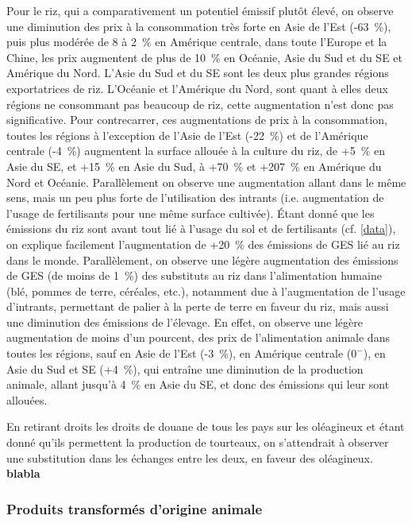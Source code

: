 Pour le riz, qui a comparativement un potentiel émissif plutôt élevé, on observe une diminution des prix à la consommation très forte en Asie de l'Est (-63~\%), puis plus modérée de 8 à 2~\% en Amérique centrale, dans toute l'Europe et la Chine, les prix augmentent de plus de 10~\% en Océanie, Asie du Sud et du SE et Amérique du Nord. L'Asie du Sud et du SE sont les deux plus grandes régions exportatrices de riz. L'Océanie et l'Amérique du Nord, sont quant à elles deux régions ne consommant pas beaucoup de riz, cette augmentation n'est donc pas significative. Pour contrecarrer, ces augmentations de prix à la consommation, toutes les régions à l'exception de l'Asie de l'Est (-22~\%) et de l'Amérique centrale (-4~\%) augmentent la surface allouée à la culture du riz, de +5~\% en Asie du SE, et +15~\% en Asie du Sud, à +70~\% et +207~\% en Amérique du Nord et Océanie. Parallèlement on observe une augmentation allant dans le même sens, mais un peu plus forte de l'utilisation des intrants (i.e. augmentation de l'usage de fertilisants pour une même surface cultivée). Étant donné que les émissions du riz sont avant tout lié à l'usage du sol et de fertilisants (cf. \ref{data}), on explique facilement l'augmentation de +20~\% des émissions de GES lié au riz dans le monde. Parallèlement, on observe une légère augmentation des émissions de GES (de moins de 1~\%) des substituts au riz dans l'alimentation humaine (blé, pommes de terre, céréales, etc.), notamment due à l'augmentation de l'usage d'intrants, permettant de palier à la perte de terre en faveur du riz, mais aussi une diminution des émissions de l'élevage. En effet, on observe une légère augmentation de moins d'un pourcent, des prix de l'alimentation animale dans toutes les régions, sauf en Asie de l'Est (-3~\%), en Amérique centrale ($0^-$), en Asie du Sud et SE (+4~\%), qui entraîne une diminution de la production animale, allant jusqu'à 4~\% en Asie du SE, et donc des émissions qui leur sont allouées.

En retirant droits les droits de douane de tous les pays sur les oléagineux et étant donné qu'ils permettent la production de tourteaux, on s'attendrait à observer une substitution dans les échanges entre les deux, en faveur des oléagineux. \textbf{blabla}


\subsubsection{Produits transformés d'origine animale}


